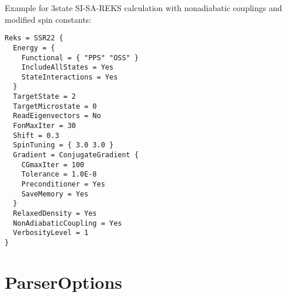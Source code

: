 Example for 3state SI-SA-REKS calculation with nonadiabatic couplings and modified spin constants:
\begin{verbatim}
Reks = SSR22 {
  Energy = {
    Functional = { "PPS" "OSS" }
    IncludeAllStates = Yes
    StateInteractions = Yes
  }
  TargetState = 2
  TargetMicrostate = 0
  ReadEigenvectors = No
  FonMaxIter = 30
  Shift = 0.3
  SpinTuning = { 3.0 3.0 }
  Gradient = ConjugateGradient {
    CGmaxIter = 100
    Tolerance = 1.0E-8
    Preconditioner = Yes
    SaveMemory = Yes
  }
  RelaxedDensity = Yes
  NonAdiabaticCoupling = Yes
  VerbosityLevel = 1
}
\end{verbatim}

\section{ParserOptions}
\label{sec:dftbp.ParserOptions}

